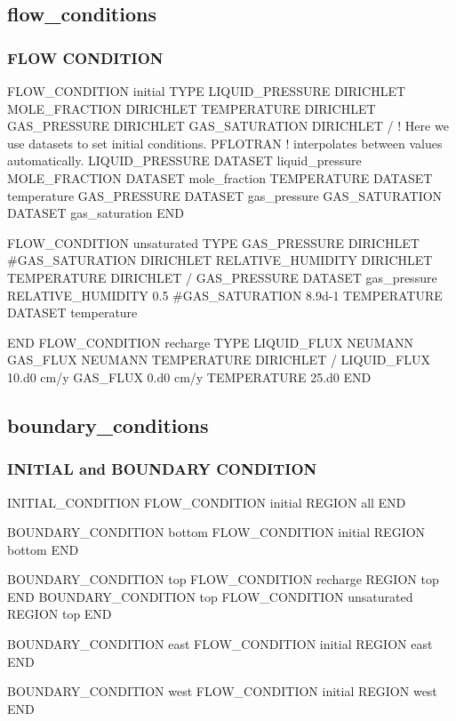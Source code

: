 \documentclass{beamer}
\newcommand\bluecomment[1]{{{\color{blue} #1}}}
\begin{document}
\subsection{flow\_conditions}

\begin{frame}\frametitle{FLOW CONDITION}

\begin{semiverbatim}
FLOW_CONDITION initial
  TYPE
    LIQUID_PRESSURE DIRICHLET
    MOLE_FRACTION DIRICHLET
    TEMPERATURE DIRICHLET
    GAS_PRESSURE DIRICHLET
    GAS_SATURATION DIRICHLET
  / \bluecomment{! Here we use datasets to set initial conditions. PFLOTRAN} 
    \bluecomment{! interpolates between values automatically.}
  LIQUID_PRESSURE DATASET liquid_pressure 
  MOLE_FRACTION DATASET mole_fraction
  TEMPERATURE DATASET temperature
  GAS_PRESSURE DATASET gas_pressure
  GAS_SATURATION DATASET gas_saturation
END



FLOW_CONDITION unsaturated
  TYPE
    GAS_PRESSURE DIRICHLET
    #GAS_SATURATION DIRICHLET
    RELATIVE_HUMIDITY DIRICHLET
    TEMPERATURE DIRICHLET
  /
  GAS_PRESSURE DATASET gas_pressure 
  RELATIVE_HUMIDITY 0.5
  #GAS_SATURATION 8.9d-1 
  TEMPERATURE DATASET temperature 

END
\newpage
FLOW_CONDITION recharge
  TYPE
    LIQUID_FLUX NEUMANN
    GAS_FLUX NEUMANN
    TEMPERATURE DIRICHLET
  /
  LIQUID_FLUX 10.d0 cm/y 
  GAS_FLUX 0.d0 cm/y
  TEMPERATURE 25.d0
END
\end{semiverbatim}

\end{frame}
\subsection{boundary_conditions}

\begin{frame}\frametitle{INITIAL and BOUNDARY CONDITION}

\begin{semiverbatim}
INITIAL_CONDITION
  FLOW_CONDITION initial
  REGION all
END

BOUNDARY_CONDITION bottom
  FLOW_CONDITION initial
  REGION bottom
END

BOUNDARY_CONDITION top
  FLOW_CONDITION recharge
  REGION top
END
\newpage
BOUNDARY_CONDITION top
  FLOW_CONDITION unsaturated
  REGION top
END

BOUNDARY_CONDITION east
  FLOW_CONDITION initial
  REGION east
END

BOUNDARY_CONDITION west
  FLOW_CONDITION initial
  REGION west
END
\end{semiverbatim}

\end{frame}
\end{document}
